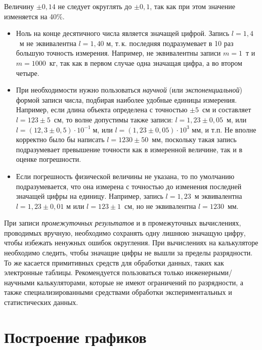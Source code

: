 Величину $\pm0{,}14$ не следует округлять до $\pm0{,}1$, так как
при этом значение изменяется на 40\%.
\begin{itemize}
\item Ноль на конце десятичного числа является значащей цифрой. Запись $l=1{,}4$~м
не эквивалентна $l=1{,}40$ м, т.\,к. последняя подразумевает в 10
раз большую точность измерения. Например, не эквивалентны записи $m=1$~т
и $m=1000$~кг, так как в первом случае одна значащая цифра, а во
втором четыре.
\item При необходимости нужно пользоваться\emph{ научной} (или \emph{экспоненциальной})
формой записи числа, подбирая наиболее удобные единицы измерения.
Например, если длина объекта определена с точностью $\pm5$~см и
составляет $l=123\pm5$~см, то волне допустимы также записи: $l=1{,}23\pm0{,}05$~м,
или $l=\left(12{,}3\pm0{,}5\right)\cdot10^{-1}\;\text{м}$, или $l=\left(1{,}23\pm0{,}05\right)\cdot10^{3}\text{ мм}$,
и т.п. Не вполне корректно было бы написать $l=1230\pm50$~мм, поскольку
такая запись подразумевает превышение точности как в измеренной величине,
так и в оценке погрешности.
\item Если погрешность физической величины не указана, то по умолчанию подразумевается,
что она измерена с точностью до изменения последней значащей цифры
на единицу. Например, запись $l=1{,}23$~м эквивалентна $l=1{,}23\pm0{,}01$
м или $l=123\pm1$~см, но не эквивалентна $l=1230$~мм.
\end{itemize}
При записи \emph{промежуточных результатов} и в промежуточных вычислениях,
проводимых вручную, необходимо сохранять одну лишнюю значащую цифру,
чтобы избежать ненужных ошибок округления. При вычислениях на калькуляторе
необходимо следить, чтобы значащие цифры не вышли за пределы разрядности.
То же касается примитивных средств для обработки данных, таких как
электронные таблицы. Рекомендуется пользоваться только инженерными/научными
калькуляторами, которые не имеют ограничений по разрядности, а также
специализированными средствами обработки экспериментальных и статистических
данных.

\section{Построение графиков}

